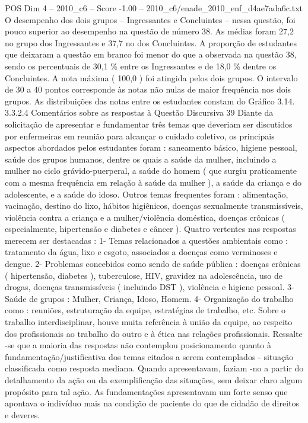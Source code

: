 \begin{textsample}{POS Dim 4 – 2010\_c6 – Score -1.00 – 2010\_c6/enade\_2010\_enf\_d4ae7ada6c.txt}
O desempenho dos dois grupos – Ingressantes e Concluintes – nessa questão, foi pouco superior ao desempenho na questão de número 38.
As médias foram 27,2 no grupo dos Ingressantes e 37,7 no dos Concluintes.
A proporção de estudantes que deixaram a questão em branco foi menor do que a observada na questão 38, sendo os percentuais de 30,1 \% entre os Ingressantes e de 18,0 \% dentre os Concluintes.
A nota máxima ( 100,0 ) foi atingida pelos dois grupos.
O intervalo de 30 a 40 pontos corresponde às notas não nulas de maior frequência nos dois grupos.
As distribuições das notas entre os estudantes constam do Gráfico 3.14. 3.3.2.4 Comentários sobre as respostas à Questão Discursiva 39 Diante da solicitação de apresentar e fundamentar três temas que deveriam ser discutidos por enfermeiras em reunião para alcançar o cuidado coletivo, os principais aspectos abordados pelos estudantes foram : saneamento básico, higiene pessoal, saúde dos grupos humanos, dentre os quais a saúde da mulher, incluindo a mulher no ciclo grávido-puerperal, a saúde do homem ( que surgiu praticamente com a mesma frequência em relação à saúde da mulher ), a saúde da criança e do adolescente, e a saúde do idoso.
Outros temas frequentes foram : alimentação, vacinação, destino do lixo, hábitos higiênicos, doenças sexualmente transmissíveis, violência contra a criança e a mulher/violência doméstica, doenças crônicas ( especialmente, hipertensão e diabetes e câncer ).
Quatro vertentes nas respostas merecem ser destacadas : 1- Temas relacionados a questões ambientais como : tratamento da água, lixo e esgoto, associados a doenças como verminoses e dengue. 2- Problemas concebidos como sendo de saúde pública : doenças crônicas ( hipertensão, diabetes ), tuberculose, HIV, gravidez na adolescência, uso de drogas, doenças transmissíveis ( incluindo DST ), violência e higiene pessoal. 3- Saúde de grupos : Mulher, Criança, Idoso, Homem. 4- Organização do trabalho como : reuniões, estruturação da equipe, estratégias de trabalho, etc.
Sobre o trabalho interdisciplinar, houve muita referência à união da equipe, ao respeito dos profissionais ao trabalho do outro e à ética nas relações profissionais.
Ressalte -se que a maioria das respostas não contemplou posicionamento quanto à fundamentação/justificativa dos temas citados a serem contemplados - situação classificada como resposta mediana.
Quando apresentavam, faziam -no a partir do detalhamento da ação ou da exemplificação das situações, sem deixar claro algum propósito para tal ação.
As fundamentações apresentavam um forte senso que apontava o indivíduo mais na condição de paciente do que de cidadão de direitos e deveres.

\end{textsample}
